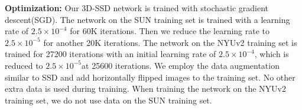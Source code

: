 \documentclass[10pt,twocolumn,letterpaper]{article}
\begin{document}
	\vspace{1mm}
	\noindent\textbf{Optimization:} Our 3D-SSD network is trained with stochastic gradient descent(SGD). The network on the SUN training set is trained with a learning rate of $2.5\times10^{-4}$ for 60K iterations. Then we reduce the learning rate to $2.5\times10^{-5}$ for another 20K iterations. The network on the NYUv2 training set is trained for 27200 iterations with an initial learning rate of $2.5\times10^{-4}$, which is reduced to $2.5\times10^{-5}$at 25600 iterations. We employ the data augmentation similar to SSD\cite{Wei2016SSD} and add horizontally flipped images to the training set. No other extra data is used during training. When training the network on the NYUv2 training set, we do not use data on the SUN training set.  
	
\end{document}
